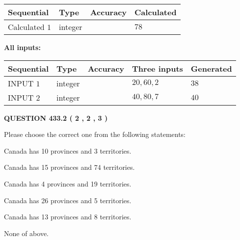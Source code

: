 \documentclass[12pt]{article}
\begin{document}
   
   
   
\noindent{}
   
   
  
  
\noindent\begin{tabular}{|l|l|l|l|}
\hline
 Sequential & Type & Accuracy & Calculated \\ 
\hline
 
 
  Calculated $  1 $ & integer &  & 
  $ 78 $ 
 \\  \hline  
 \end{tabular}
   
   
   
   
\noindent\vspace{0.1in}\hspace{-0.08in} {\textbf{\Large{All inputs: }}}
   
   
  
  
\noindent\begin{tabular}{|l|l|l|l|l|}
\hline
 Sequential & Type & Accuracy & Three inputs & Generated \\ 
\hline
 
 
  INPUT $  1 $ & integer &  & $
 20
 , 
 60
 , 
 2
 $ & $ 38 $ 
 \\  \hline  
 
 
  INPUT $  2 $ & integer &  & $
 40
 , 
 80
 , 
 7
 $ & $ 40 $ 
 \\  \hline  
 \end{tabular}
   
   
  
\vspace{0.2in}
  
{\textbf{\Large{QUESTION
433.2 
 ( 2 , 2 , 3 )
}}}
  
  
Please choose the correct one from the following statements:
 
 
Canada has 10  provinces and 3 territories.
 
 
Canada has  15 provinces and  74 territories.
 
 
Canada has   4 provinces and  19 territories.
 
 
Canada has  26 provinces and  5 territories.
 
 
Canada has  13 provinces and  8 territories.
 
 
 None of above.
 
\end{document}
